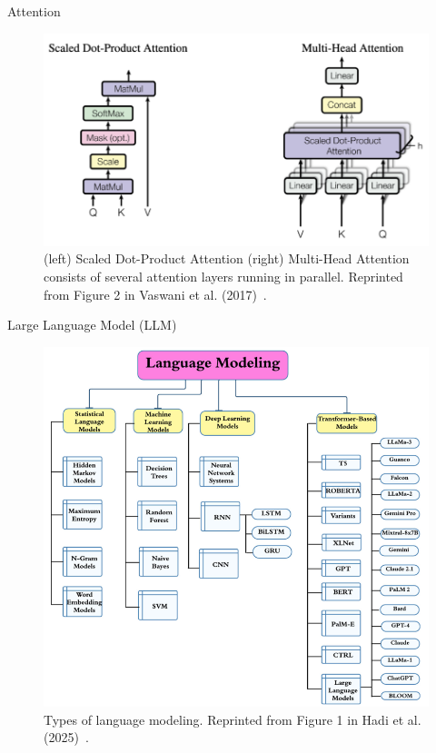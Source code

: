 \documentclass[12pt]{beamer}
\begin{document}
\begin{frame}[allowframebreaks]{Attention}
    \begin{figure}
        \centering
        \includegraphics[height=0.5\textheight]{figures/attention.png}
        \caption{(left) Scaled Dot-Product Attention (right) Multi-Head Attention consists of several attention layers running in parallel. Reprinted from Figure 2 in Vaswani et al. (2017)~\cite{vaswani2017attention}.}
        \label{fig:Fig. 2}
    \end{figure}
\end{frame}

\begin{frame}[allowframebreaks]{Large Language Model (LLM)}
    \begin{figure}
        \centering
        \includegraphics[height=0.64\textheight]{figures/lm_taxonomy.png}
        \caption{Types of language modeling. Reprinted from Figure 1 in Hadi et al. (2025)~\cite{Hadi_2025}.}
        \label{fig:Fig. 3}
    \end{figure}
\end{frame}
\end{document}
